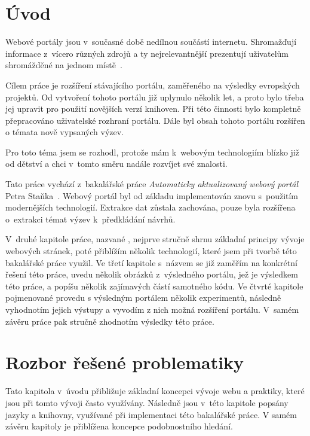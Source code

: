 \chapter{Úvod}
Webové portály jsou v~současné době nedílnou součástí internetu. Shromažďují informace z~vícero různých zdrojů a ty nejrelevantnější prezentují uživatelům shromážděné na jednom místě~\cite{bib:portal-liferay}. \blindtext

Cílem práce je rozšíření stávajícího portálu, zaměřeného na výsledky evropských projektů. Od vytvoření tohoto portálu již uplynulo několik let, a proto bylo třeba jej upravit pro použití novějších verzí knihoven. Při této činnosti bylo kompletně přepracováno uživatelské rozhraní portálu. Dále byl obsah tohoto portálu rozšířen o témata nově vypsaných výzev. %

Pro toto téma jsem se rozhodl, protože mám k~webovým technologiím blízko již od dětství a chci v~tomto směru nadále rozvíjet své znalosti.

Tato práce vychází z~bakalářské práce \emph{Automaticky aktualizovaný webový portál} Petra Staňka~\cite{bib:stanek}.
Webový portál byl od základu implementován znovu s~použitím modernějších technologií. Extrakce dat zůstala zachována, pouze byla rozšířena o~extrakci témat výzev k~předkládání návrhů.

V~druhé kapitole práce, nazvané , nejprve stručně shrnu základní principy vývoje webových stránek, poté přiblížím několik technologií, které jsem při tvorbě této bakalářské práce využil.
Ve třetí kapitole s~názvem  se již zaměřím na konkrétní řešení této práce, uvedu několik obrázků z~výsledného portálu, jež je výsledkem této práce, a popíšu několik zajímavých částí samotného kódu.
Ve čtvrté kapitole pojmenované  provedu s výsledným portálem několik experimentů, následně vyhodnotím jejich výstupy a vyvodím z nich možná rozšíření portálu.
V~samém závěru práce pak stručně zhodnotím výsledky této práce.




\chapter{Rozbor řešené problematiky}
Tato kapitola v~úvodu přibližuje základní koncepci vývoje webu a praktiky, které jsou při tomto vývoji často využívány. Následně jsou v~této kapitole popsány jazyky a knihovny, využívané při implementaci této bakalářské práce. V samém závěru kapitoly je přiblížena koncepce podobnostního hledání.



